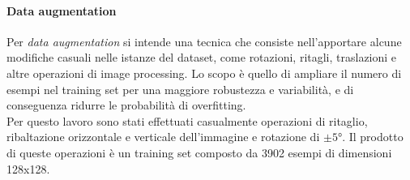 \paragraph{Data augmentation}
Per \textit{data augmentation} si intende una tecnica che consiste nell'apportare alcune modifiche casuali nelle istanze del dataset, come rotazioni, ritagli, traslazioni e altre operazioni di image processing. Lo scopo è quello di ampliare il numero di esempi nel training set per una maggiore robustezza e variabilità, e di conseguenza ridurre le probabilità di overfitting.\\
Per questo lavoro sono stati effettuati casualmente operazioni di ritaglio, ribaltazione orizzontale e verticale dell'immagine e rotazione di $\pm \ang{5}$. Il prodotto di queste operazioni è un training set composto da 3902 esempi di dimensioni 128x128.